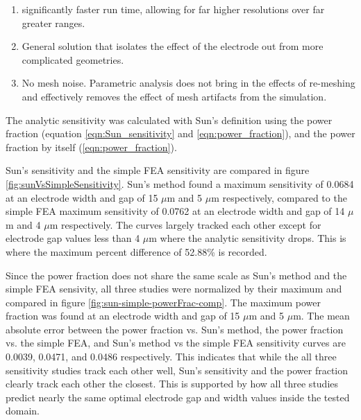 \begin{enumerate}
	\item significantly faster run time, allowing for far higher resolutions over far greater ranges.
	\item General solution that isolates the effect of the electrode out from more complicated geometries.
	\item No mesh noise. Parametric analysis does not bring in the effects of re-meshing and effectively removes the effect of mesh artifacts from the simulation.
\end{enumerate}

\noindent The analytic sensitivity was calculated with Sun's definition using the power fraction (equation \ref{eqn:Sun_sensitivity} and \ref{eqn:power_fraction}), and the power fraction by itself (\ref{eqn:power_fraction}). 

\par Sun's sensitivity and the simple FEA sensitivity are compared in figure \ref{fig:sunVsSimpleSensitivity}. Sun's method found a maximum sensitivity of 0.0684 at an electrode width and gap of 15 $\mu$m and 5 $\mu$m respectively, compared to the simple FEA maximum sensitivity of 0.0762 at an electrode width and gap of 14 $\mu$m and 4 $\mu$m respectively. The curves largely tracked each other except for electrode gap values less than 4 $\mu$m where the analytic sensitivity drops. This is where the maximum percent difference of 52.88\% is recorded. 
\par Since the power fraction does not share the same scale as Sun's method and the simple FEA sensivity, all three studies were normalized by their maximum and compared in figure \ref{fig:sun-simple-powerFrac-comp}. The maximum power fraction was found at an electrode width and gap of 15 $\mu$m and 5 $\mu$m. The mean absolute error between the power fraction vs. Sun's method, the power fraction vs. the simple FEA, and Sun's method vs the simple FEA sensitivity curves are 0.0039, 0.0471, and 0.0486 respectively. This indicates that while the all three sensitivity studies track each other well, Sun's sensitivity and the power fraction clearly track each other the closest. This is supported by how all three studies predict nearly the same optimal electrode gap and width values inside the tested domain. 



